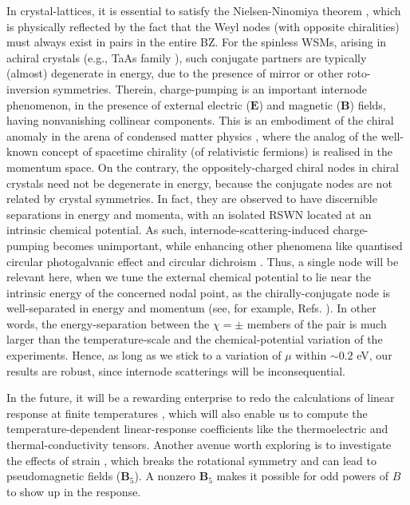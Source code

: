 \documentclass[aps,prb,onecolumn,nofootinbib,citeautoscript,10pt, showkeys]{revtex4-2}
\begin{document}
In crystal-lattices, it is essential to satisfy the Nielsen-Ninomiya theorem \cite{nielsen81_no}, which is physically reflected by the fact that the Weyl nodes (with opposite chiralities) must always exist in pairs in the entire BZ. For the spinless WSMs, arising in achiral crystals (e.g., TaAs family \cite{lv_Weyl}), such conjugate partners are typically (almost) degenerate in energy, due to the presence of mirror or other roto-inversion symmetries. Therein, charge-pumping is an important internode phenomenon, in the presence of external electric ($\boldsymbol E $) and magnetic ($\boldsymbol B $) fields, having nonvanishing collinear components. This is an embodiment of the chiral anomaly in the arena of condensed matter physics \cite{chiral_ABJ, son13_chiral, li_nmr17, ips-internode}, where the analog of the well-known concept of spacetime chirality (of relativistic fermions) is realised in the momentum space. On the contrary, the oppositely-charged chiral nodes in chiral crystals need not be degenerate in energy, because the conjugate nodes are not related by crystal symmetries. In fact, they are observed to have discernible separations in energy and momenta, with an isolated RSWN located at an intrinsic chemical potential. As such, internode-scattering-induced charge-pumping becomes unimportant, while enhancing other phenomena like quantised circular photogalvanic effect \cite{bernevig, chang2018, ni2021_giant, moore18_optical, guo23_light,kozii, ips_cpge} and circular dichroism \cite{ips-cd1, ips_cd}. Thus, a single node will be relevant here, when we tune the external chemical potential to lie near the intrinsic energy of the concerned nodal point, as the chirally-conjugate node is well-separated in energy and momentum (see, for example, Refs. \cite{titus-ksm, law-ksm}). In other words, the energy-separation between the $\chi =\pm $ members of the pair is much larger than the temperature-scale and the chemical-potential variation of the experiments. Hence, as long as we stick to a variation of $\mu$ within $\sim 0.2 $ eV, our results are robust, since internode scatterings will be inconsequential.


In the future, it will be a rewarding enterprise to redo the calculations of linear response at finite temperatures \cite{ips_rahul_ph_strain, rahul-jpcm, ips-ruiz, ips-shreya, ips-rsw-ph, ips_tilted_dirac, ips-spin1-ph, ips-hermann-review}, which will also enable us to compute the temperature-dependent linear-response coefficients like the thermoelectric and thermal-conductivity tensors. Another avenue worth exploring is to investigate the effects of strain \cite{awadhesh_rsw-strain, ips_rahul_ph_strain, ips-ruiz, ips-rsw-ph}, which breaks the rotational symmetry and can lead to pseudomagnetic fields ($\boldsymbol B_5 $). A nonzero $\boldsymbol B_5$ makes it possible for odd powers of $ B$ to show up in the response.
\end{document}
